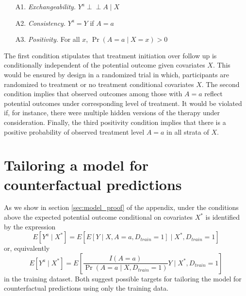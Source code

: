 \begin{enumerate}
    \item[A1.] \textit{Exchangeability.} $Y^a \perp\!\!\!\perp A \mid X$ 
    \item[A2.] \textit{Consistency.} $Y^a = Y$ if $A = a$
    \item[A3.] \textit{Positivity.} For all $x$, $\Pr(A = a \mid X = x) > 0$ 
\end{enumerate}

The first condition stipulates that treatment initiation over follow up is conditionally independent of the potential outcome given covariates $X$. This would be ensured by design in a randomized trial in which, participants are randomized to treatment or no treatment conditional covariates $X$. The second condition implies that observed outcomes among those with $A = a$ reflect potential outcomes under corresponding level of treatment. It would be violated if, for instance, there were multiple hidden versions of the therapy under consideration. Finally, the third positivity condition implies that there is a positive probability of observed treatment level $A = a$ in all strata of $X$.  

\section{Tailoring a model for counterfactual predictions} \label{sec:model}

As we show in section \ref{sec:model_proof} of the appendix, under the conditions above the expected potential outcome conditional on covariates $X^*$ is identified by the expression
\begin{equation}\label{eqn:estimand1}
    E[Y^a \mid X^*] = E[E[Y \mid X, A = a, D_{train} = 1] \mid X^*, D_{train} = 1]
\end{equation}
or, equivalently 
\begin{equation}\label{eqn:estimand2}
    E[Y^a \mid X^*] = E\left[\frac{I(A = a)}{\Pr(A = a \mid X, D_{train} = 1)} Y \mid X^*, D_{train} = 1\right]
\end{equation}
in the training dataset. Both suggest possible targets for tailoring the model for counterfactual predictions using only the training data. 

